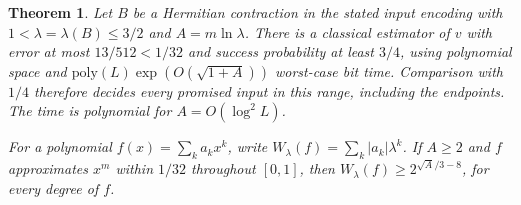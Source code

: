 \documentclass[11pt]{article}
\newtheorem{theorem}{Theorem}
\begin{document}
\begin{theorem}\label{thm:sampling}
Let \(B\) be a Hermitian contraction in the stated input encoding with \(1<\lambda=\lambda(B)\le3/2\) and \(A=m\ln\lambda\). There is a classical estimator of \(v\) with error at most \(13/512<1/32\) and success probability at least \(3/4\), using polynomial space and \(\mathrm{poly}(L)\exp(O(\sqrt{1+A}))\) worst-case bit time. Comparison with \(1/4\) therefore decides every promised input in this range, including the endpoints. The time is polynomial for \(A=O(\log^2 L)\).

For a polynomial \(f(x)=\sum_k a_kx^k\), write \(W_\lambda(f)=\sum_k|a_k|\lambda^k\). If \(A\ge2\) and \(f\) approximates \(x^m\) within \(1/32\) throughout \([0,1]\), then \(W_\lambda(f)\ge2^{\sqrt A/3-8}\), for every degree of \(f\).
\end{theorem}
\end{document}
